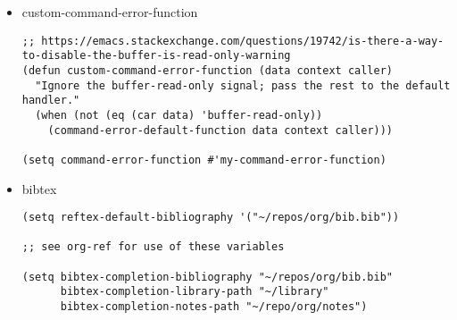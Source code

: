 \documentclass{article}
\begin{document}
\begin{itemize}
\begin{itemize}
\begin{itemize}
\begin{verbatim}
(define-key global-map "\C-ca" 'org-agenda)
(setq org-agenda-skip-unavailable-files t)

(setq org-agenda-use-tag-inheritance t)
;;  http://stackoverflow.com/questions/36873727/make-org-agenda-full-screen
(setq org-agenda-window-setup (quote only-window))
(setq org-agenda-todo-ignore-time-comparison-use-seconds t)

;;; Based on http://article.gmane.org/gmane.emacs.orgmode/41427
  (defun my-skip-tag(tag)
    "Skip entries that are tagged TAG"
    (let* ((entry-tags (org-get-tags-at (point))))
      (if (member tag entry-tags)
          (progn (outline-next-heading) (point))
        nil)))

\end{verbatim}
\begin{verbatim}
;; Needed for no y/n prompt at linked agenda execution
(setq org-confirm-elisp-link-function nil)

\end{verbatim}
\end{itemize}

\item custom-command-error-function
\label{sec:org64278be}
\begin{verbatim}
;; https://emacs.stackexchange.com/questions/19742/is-there-a-way-to-disable-the-buffer-is-read-only-warning
(defun custom-command-error-function (data context caller)
  "Ignore the buffer-read-only signal; pass the rest to the default handler."
  (when (not (eq (car data) 'buffer-read-only))
    (command-error-default-function data context caller)))

(setq command-error-function #'my-command-error-function)
\end{verbatim}
\item bibtex
\label{sec:org66d063b}
\begin{verbatim}
(setq reftex-default-bibliography '("~/repos/org/bib.bib"))

;; see org-ref for use of these variables

(setq bibtex-completion-bibliography "~/repos/org/bib.bib"
      bibtex-completion-library-path "~/library"
      bibtex-completion-notes-path "~/repo/org/notes")


\end{verbatim}
\end{itemize}
\end{itemize}
\end{document}

